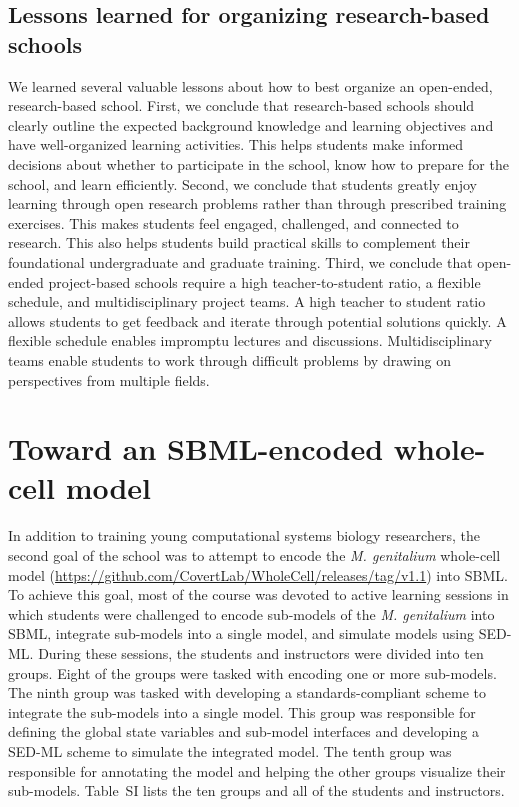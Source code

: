 \documentclass[journal,transmag]{IEEEtran}
\begin{document}
\subsection{Lessons learned for organizing research-based schools}
We learned several valuable lessons about how to best organize an open-ended, research-based school. First, we conclude that research-based schools should clearly outline the expected background knowledge and learning objectives and have well-organized learning activities. This helps students make informed decisions about whether to participate in the school, know how to prepare for the school, and learn efficiently.
Second, we conclude that students greatly enjoy learning through open research problems rather than through prescribed training exercises. This makes students feel engaged, challenged, and connected to research. This also helps students build practical skills to complement their foundational undergraduate and graduate training.
Third, we conclude that open-ended project-based schools require a high teacher-to-student ratio, a flexible schedule, and multidisciplinary project teams. A high teacher to student ratio allows students to get feedback and iterate through potential solutions quickly. A flexible schedule enables impromptu lectures and discussions. Multidisciplinary teams enable students to work through difficult problems by drawing on perspectives from multiple fields. 

\section{Toward an SBML-encoded whole-cell model}
In addition to training young computational systems biology researchers, the second goal of the school was to attempt to encode the \textit{M. genitalium} whole-cell model (\url{https://github.com/CovertLab/WholeCell/releases/tag/v1.1}) into SBML. To achieve this goal, most of the course was devoted to active learning sessions in which students were challenged to encode sub-models of the \textit{M. genitalium} into SBML, integrate sub-models into a single model, and simulate models using SED-ML. During these sessions, the students and instructors were divided into ten groups. Eight of the groups were tasked with encoding one or more sub-models. The ninth group was tasked with developing a standards-compliant scheme to integrate the sub-models into a single model. This group was responsible for defining the global state variables and sub-model interfaces and developing a SED-ML scheme to simulate the integrated model. The tenth group was responsible for annotating the model and helping the other groups visualize their sub-models. Table~SI lists the ten groups and all of the students and instructors. 
\end{document}
